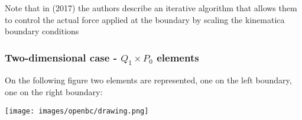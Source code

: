 Note that in \textcite{lige17} (2017) the authors describe an iterative algorithm that 
allows them to control the actual force applied at the boundary by 
scaling the kinematica boundary conditions

\subsubsection{Two-dimensional case - $Q_1 \times P_0$ elements}

On the following figure two elements are represented, one on the 
left boundary, one on the right boundary:
\begin{center}
\texttt{[image: images/openbc/drawing.png]}
\end{center}

